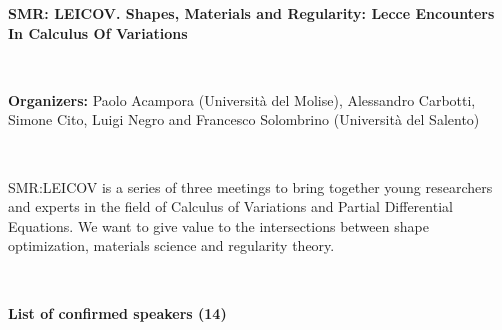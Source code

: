 \documentclass[a4paper,11pt]{article}
\begin{document}
\begin{center}\LARGE\bf
	SMR: LEICOV. Shapes, Materials and Regularity: Lecce Encounters In Calculus Of Variations

\end{center}

\

\begin{center}
	{\bf\large Organizers:}
	Paolo Acampora (Universit\`a del Molise),
	Alessandro Carbotti, Simone Cito, Luigi Negro and Francesco Solombrino (Universit\`a del Salento)
\end{center}

\

\noindent
SMR:LEICOV is a series of three meetings to bring together young researchers and experts in the field of Calculus of Variations and Partial Differential Equations. We want to give value to the intersections between shape optimization, materials science and regularity theory.

\

{\bf List of confirmed speakers (14)}
\end{document}
